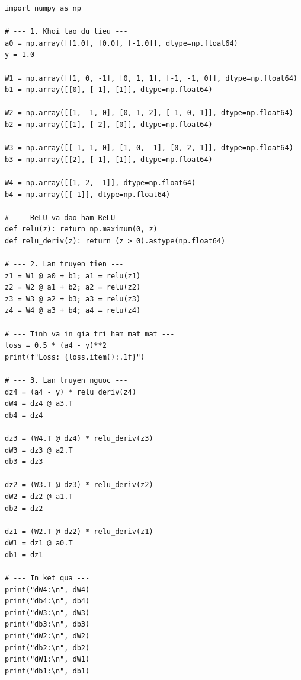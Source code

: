 \begin{lstlisting}[caption= Quá trình tính toán lan truyền tiến và lan truyền ngược bằng Numpy.]
import numpy as np

# --- 1. Khoi tao du lieu ---
a0 = np.array([[1.0], [0.0], [-1.0]], dtype=np.float64)
y = 1.0

W1 = np.array([[1, 0, -1], [0, 1, 1], [-1, -1, 0]], dtype=np.float64)
b1 = np.array([[0], [-1], [1]], dtype=np.float64)

W2 = np.array([[1, -1, 0], [0, 1, 2], [-1, 0, 1]], dtype=np.float64)
b2 = np.array([[1], [-2], [0]], dtype=np.float64)

W3 = np.array([[-1, 1, 0], [1, 0, -1], [0, 2, 1]], dtype=np.float64)
b3 = np.array([[2], [-1], [1]], dtype=np.float64)

W4 = np.array([[1, 2, -1]], dtype=np.float64)
b4 = np.array([[-1]], dtype=np.float64)

# --- ReLU va dao ham ReLU ---
def relu(z): return np.maximum(0, z)
def relu_deriv(z): return (z > 0).astype(np.float64)

# --- 2. Lan truyen tien ---
z1 = W1 @ a0 + b1; a1 = relu(z1)
z2 = W2 @ a1 + b2; a2 = relu(z2)
z3 = W3 @ a2 + b3; a3 = relu(z3)
z4 = W4 @ a3 + b4; a4 = relu(z4)

# --- Tinh va in gia tri ham mat mat ---
loss = 0.5 * (a4 - y)**2
print(f"Loss: {loss.item():.1f}")

# --- 3. Lan truyen nguoc ---
dz4 = (a4 - y) * relu_deriv(z4)
dW4 = dz4 @ a3.T
db4 = dz4

dz3 = (W4.T @ dz4) * relu_deriv(z3)
dW3 = dz3 @ a2.T
db3 = dz3

dz2 = (W3.T @ dz3) * relu_deriv(z2)
dW2 = dz2 @ a1.T
db2 = dz2

dz1 = (W2.T @ dz2) * relu_deriv(z1)
dW1 = dz1 @ a0.T
db1 = dz1

# --- In ket qua --- 
print("dW4:\n", dW4)
print("db4:\n", db4)
print("dW3:\n", dW3)
print("db3:\n", db3)
print("dW2:\n", dW2)
print("db2:\n", db2)
print("dW1:\n", dW1)
print("db1:\n", db1)
\end{lstlisting}

